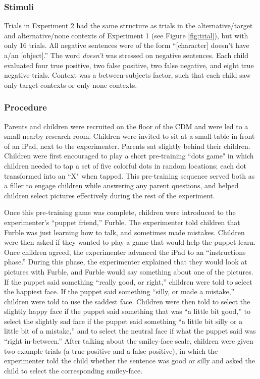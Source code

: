 \documentclass[man, noapacite]{apa2}
\begin{document}
\subsubsection{Stimuli}

Trials in Experiment 2 had the same structure as trials in the alternative/target and alternative/none contexts of Experiment 1 (see Figure \ref{fig:trial}), but with only 16 trials. All negative sentences were of the form ``[character] doesn't have a/an [object].'' The word \emph{doesn't} was stressed on negative sentences. Each child evaluated four true positive, two false positive, two false negative, and eight true negative trials. Context was a between-subjects factor, such that each child saw only target contexts or only none contexts.

\subsubsection{Procedure}

Parents and children were recruited on the floor of the CDM and were led to a small nearby research room. Children were invited to sit at a small table in front of an iPad, next to the experimenter. Parents sat slightly behind their children. Children were first encouraged to play a short pre-training ``dots game" in which children needed to tap a set of five colorful dots in random locations; each dot transformed into an ``X" when tapped. This pre-training sequence served both as a filler to engage children while answering any parent questions, and helped children select pictures effectively during the rest of the experiment.

Once this pre-training game was complete, children were introduced to the experimenter's ``puppet friend,'' Furble. The experimenter told children that Furble was just learning how to talk, and sometimes made mistakes. Children were then asked if they wanted to play a game that would help the puppet learn. Once children agreed, the experimenter advanced the iPad to an ``instructions phase.'' During this phase, the experimenter explained that they would look at pictures with Furble, and Furble would say something about one of the pictures. If the puppet said something ``really good, or right,'' children were told to select the happiest face. If the puppet said something ``silly, or made a mistake,'' children were told to use the saddest face. Children were then told to select the slightly happy face if the puppet said something that was ``a little bit good,'' to select the slightly sad face if the puppet said something ``a little bit silly or a little bit of a mistake,'' and to select the neutral face if what the puppet said was ``right in-between.'' After talking about the smiley-face scale, children were given two example trials (a true positive and a false positive), in which the experimenter told the child whether the sentence was good or silly and asked the child to select the corresponding smiley-face.
\end{document}

